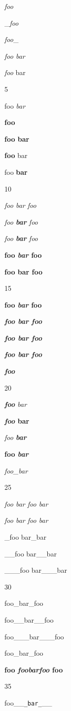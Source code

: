 \emph{foo}

\_\emph{foo}

\emph{foo}\_

\emph{foo bar}

\emph{foo} bar

5

foo \emph{bar}

\textbf{foo}

\textbf{foo bar}

\textbf{foo} bar

foo \textbf{bar}

10

\emph{foo \emph{bar} foo}

\emph{foo \textbf{bar} foo}

\emph{foo \textbf{\emph{bar}} foo}

\textbf{foo \emph{bar} foo}

\textbf{foo \textbf{bar} foo}

15

\textbf{foo \textbf{\emph{bar}} foo}

\textbf{\emph{foo \emph{bar} foo}}

\textbf{\emph{foo \textbf{bar} foo}}

\textbf{\emph{foo \textbf{\emph{bar}} foo}}

\textbf{\emph{foo}}

20

\emph{\textbf{foo} bar}

\textbf{\emph{foo} bar}

\emph{foo \textbf{bar}}

\textbf{foo \emph{bar}}

\emph{foo\_bar}

25

\emph{foo \emph{bar \emph{foo \emph{bar}}}}

\emph{\emph{\emph{\emph{foo} bar} foo} bar}

\_foo bar\_bar

\_\_foo bar\_\_bar

\_\_\_foo bar\_\_\_bar

30

foo\_bar\_foo

foo\_\_bar\_\_foo

foo\_\_\_bar\_\_\_foo

foo\_bar\_foo

\textbf{foo \emph{foobarfoo} foo}

35

foo\_\_\texttt{_bar_}\_\_

